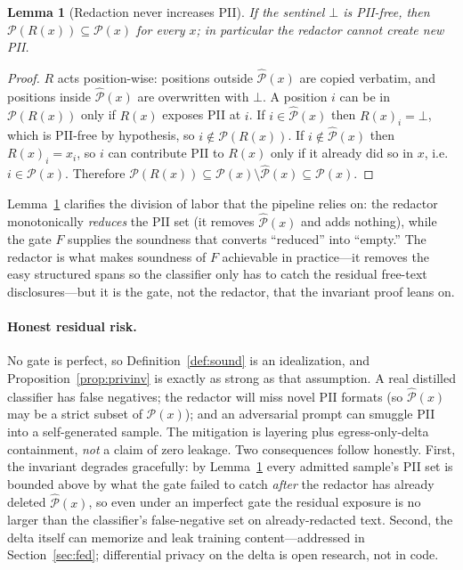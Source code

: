 \documentclass[11pt]{article}
\newtheorem{lemma}{Lemma}
\begin{document}
\begin{lemma}[Redaction never increases PII]
\label{lem:redact}
If the sentinel $\bot$ is PII-free, then $\mathcal{P}(R(x)) \subseteq \mathcal{P}(x)$ for every $x$; in particular the redactor cannot create new PII.
\end{lemma}

\begin{proof}
$R$ acts position-wise: positions outside $\hat{\mathcal{P}}(x)$ are copied verbatim, and positions inside $\hat{\mathcal{P}}(x)$ are overwritten with $\bot$. A position $i$ can be in $\mathcal{P}(R(x))$ only if $R(x)$ exposes PII at $i$. If $i \in \hat{\mathcal{P}}(x)$ then $R(x)_i = \bot$, which is PII-free by hypothesis, so $i \notin \mathcal{P}(R(x))$. If $i \notin \hat{\mathcal{P}}(x)$ then $R(x)_i = x_i$, so $i$ can contribute PII to $R(x)$ only if it already did so in $x$, i.e. $i \in \mathcal{P}(x)$. Therefore $\mathcal{P}(R(x)) \subseteq \mathcal{P}(x) \setminus \hat{\mathcal{P}}(x) \subseteq \mathcal{P}(x)$.
\end{proof}

Lemma~\ref{lem:redact} clarifies the division of labor that the pipeline relies on: the redactor monotonically \emph{reduces} the PII set (it removes $\hat{\mathcal{P}}(x)$ and adds nothing), while the gate $F$ supplies the soundness that converts ``reduced'' into ``empty.'' The redactor is what makes soundness of $F$ achievable in practice---it removes the easy structured spans so the classifier only has to catch the residual free-text disclosures---but it is the gate, not the redactor, that the invariant proof leans on.

\paragraph{Honest residual risk.}
No gate is perfect, so Definition~\ref{def:sound} is an idealization, and Proposition~\ref{prop:privinv} is exactly as strong as that assumption. A real distilled classifier has false negatives; the redactor will miss novel PII formats (so $\hat{\mathcal{P}}(x)$ may be a strict subset of $\mathcal{P}(x)$); and an adversarial prompt can smuggle PII into a self-generated sample. The mitigation is layering plus egress-only-delta containment, \emph{not} a claim of zero leakage. Two consequences follow honestly. First, the invariant degrades gracefully: by Lemma~\ref{lem:redact} every admitted sample's PII set is bounded above by what the gate failed to catch \emph{after} the redactor has already deleted $\hat{\mathcal{P}}(x)$, so even under an imperfect gate the residual exposure is no larger than the classifier's false-negative set on already-redacted text. Second, the delta itself can memorize and leak training content---addressed in Section~\ref{sec:fed}; differential privacy on the delta is open research, not in code.
\end{document}
